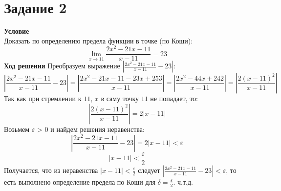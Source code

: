 \newpage
\section{Задание 2} 
{\bf\large Условие} \\
Доказать по определению предела функции в точке (по Коши):
\[
    \lim_{x\rightarrow11}{\frac{2x^2-21x-11}{x-11}}=23
\]
{\bf\large Ход решения} 
Преобразуем выражение $\left|\frac{2x^2-21x-11}{x-11}-23\right|$:
\[
    \left|\frac{2x^2-21x-11}{x-11}-23\right|=\left|\frac{2x^2-21x-11-23x+253}{x-11}\right|=\left|\frac{2x^2-44x+242}{x-11}\right|=\left|\frac{2(x-11)^2}{x-11}\right|
\]
Так как при стремлении к $11$, $x$ в саму точку $11$ не попадает, то:
\[
    \left|\frac{2(x-11)^2}{x-11}\right| = 2\left|x-11\right|
\]
Возьмем $\varepsilon$ > 0 и найдем решения неравенства:
\[
    \left|\frac{2x^2-21x-11}{x-11}-23\right| = 2\left|x-11\right| < \varepsilon
\]
\[    
    \left|x-11\right| < \frac{\varepsilon}{2}
\]
Получается, что из неравенства $\left|x-11\right| < \frac{\varepsilon}{2}$ следует $\left|\frac{2x^2-21x-11}{x-11}-23\right| < \varepsilon$, то есть выполнено определение предела по Коши для $\delta =  \frac{\varepsilon}{2}$. ч.т.д.
